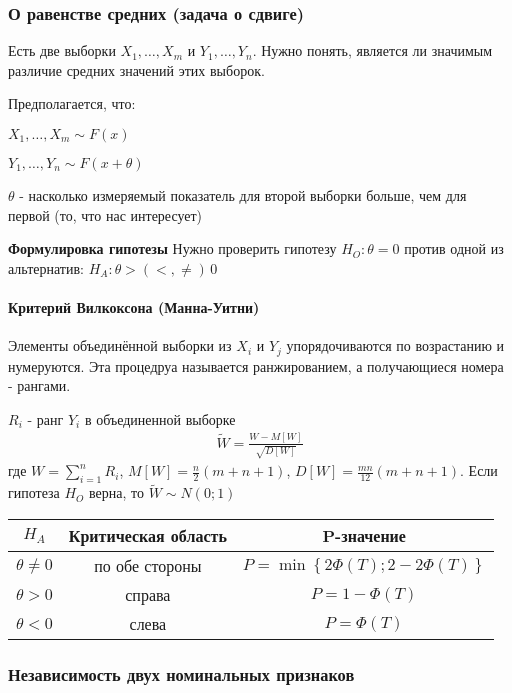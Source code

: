 \documentclass[12pt]{extarticle}
\begin{document}
\subsubsection{О равенстве средних (задача о сдвиге)}
Есть две выборки $X_{1},\ldots,X_{m}$ и $Y_{1},\ldots,Y_{n}$. Нужно
понять, является ли значимым различие средних значений этих выборок.
\par Предполагается, что:
\begin{description}
    \item $X_{1},\ldots,X_{m}\sim F(x)$
    \item $Y_{1},\ldots,Y_{n}\sim F(x+\theta)$
\end{description}
$\theta$ - насколько измеряемый показатель для второй выборки больше,
чем для первой (то, что нас интересует)
\par\textbf{Формулировка гипотезы} Нужно проверить гипотезу
$H_{O}:\theta=0$ против одной из альтернатив: $H_{A}:\theta >(<,\neq)\,0$

\paragraph{Критерий Вилкоксона (Манна-Уитни)}
Элементы  объединённой выборки из $X_{i}$ и $Y_{j}$ упорядочиваются по
возрастанию и нумеруются. Эта процедруа называется ранжированием, а
получающиеся номера - рангами.
\par $R_{i}$ - ранг $Y_{i}$ в объединенной выборке
\begin{eqnarray*}
    \widetilde{W}=\frac{W-M[W]}{\sqrt{D[W]}}
\end{eqnarray*}
где $W=\sum\limits_{i=1}^{n}R_{i}$, $M[W] = \frac{n}{2}(m+n+1)$,
$D[W]=\frac{mn}{12}(m+n+1)$. Если гипотеза $H_{O}$ верна, то
$\widetilde{W}\sim N(0;1)$
\begin{center} \begin{tabular}{c|c|c}
    $H_{A}$ & Критическая область & P-значение \\\hline
    $\theta\neq 0$ & по обе стороны &
    $P=\min\left\{2\Phi(T);2-2\Phi(T)\right\}$\\\hline
    $\theta > 0$ & справа & $P=1-\Phi(T)$ \\\hline
    $\theta < 0$ & слева & $P=\Phi(T)$ \\
\end{tabular} \end{center}

\subsubsection{Независимость двух номинальных признаков}
\end{document}
